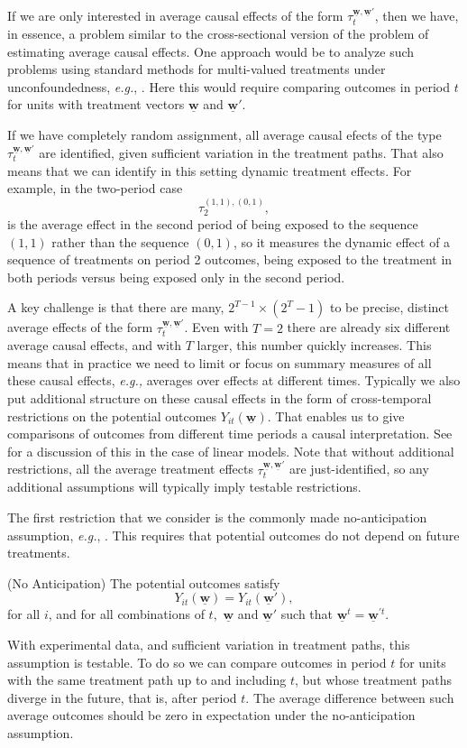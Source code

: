 \documentclass[letterpaper,12pt,leqno]{article}
\newcommand{\ubww}{\underline{\mathbf{w}}}
\begin{document}
If we are only interested in average causal effects of the form $\tau^{\ubww,\ubww'}_{t}$, 
then we have, in essence, a problem similar to the cross-sectional version of the problem of estimating average causal effects. One approach would be to analyze such problems using standard methods for multi-valued treatments under unconfoundedness, {\it e.g.}, \citep{imbens2000}.  Here this would require comparing outcomes in period $t$ for units with treatment vectors $\ubww$ and $\ubww'$.

If we have completely random assignment, all average causal efects of the type $\tau^{\ubww,\ubww'}_{t}$ are identified, given sufficient variation in the treatment paths. That also means that we can identify in this setting dynamic treatment effects. For example, in the two-period case
\[ \tau^{(1,1),(0,1)}_2,\]
is the average effect in the second period of being exposed to the sequence $(1,1)$ rather than the sequence $(0,1)$, so it measures the dynamic effect of a sequence of treatments on period 2 outcomes, being exposed to the treatment in both periods versus being exposed only in the second period.


A key challenge is that there are many, 
 $2^{T-1}\times(2^T-1)$ to be precise, distinct average effects of the form $\tau^{\ubww,\ubww'}_{t}$. 
Even with $T=2$  there are already six different average causal effects, and with $T$ larger, this number quickly increases. This means that in practice we need to limit or focus on summary measures of all these causal effects, {\it e.g.,} averages over effects at different times. Typically we also put additional structure on these causal effects in the form of cross-temporal restrictions on the potential outcomes $Y_{it}(\ubww)$. That enables us to give comparisons of outcomes from different time periods a causal interpretation. See \citep{chamberlain1984panel} for a discussion of this in the case of linear models. Note that without additional restrictions, all the average treatment effects  $\tau^{\ubww,\ubww'}_{t}$ are just-identified, so any additional assumptions will typically imply testable restrictions.

The first restriction that we consider is the commonly made no-anticipation assumption, {\it e.g.}, \citep{athey2021design, callaway2020difference, sun2020estimating}. This requires that potential outcomes do not depend on future treatments.
\begin{assumption}{\sc (No Anticipation)}\label{as:no_an}
The potential outcomes satisfy
\[Y_{it}(\ubww)=Y_{it}(\ubww'), \]
for all $i$, and for all combinations of $t,$ $\ubww$ and $\ubww'$ such that
$\ubww^t=\ubww^{\prime t}$.
\end{assumption}
With experimental data, and sufficient variation in treatment paths, this assumption is testable. To do so we can compare outcomes in period $t$ for units with the same treatment path up to and including $t$, but whose treatment paths diverge in the future, that is, after period $t$. The average difference between such average outcomes should be zero in expectation under the no-anticipation assumption.
\end{document}
